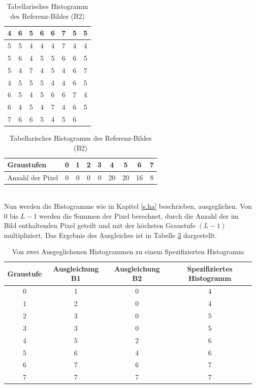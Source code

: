   \begin{table}
  [h]
  \caption{Tabellarisches Histogramm des Referenz-Bildes (B2)}
  \label{tab:b2}
  \centering
  \begin{minipage}{\textwidth}
  \center
  \begin{tabular}{|c|c|c|c|c|c|c|c|}
  \hline
  4&6&5&6&6&7&5&5\\
  \hline
  5&5&4&4&4&7&4&4\\
  \hline
  5&6&4&5&5&6&6&5\\
  \hline
  5&4&7&4&5&4&6&7\\
  \hline
  4&5&5&5&4&4&6&5\\
  \hline
  6&5&4&5&6&6&7&4\\
  \hline
  6&4&5&4&7&4&6&5\\
  \hline
  7&6&6&5&4&5&6&\\ %
  \hline
  \end{tabular}
  \end{minipage}
  \begin{minipage}{\textwidth}
  \hspace{\textwidth}
  \end{minipage}
  \begin{minipage}{\textwidth}
  \center
  \begin{tabular}{|l|c|c|c|c|c|c|c|c|}
  \hline
  Graustufen & 0 & 1 & 2 & 3 & 4 & 5 & 6 & 7\\
  \hline
  Anzahl der Pixel & 0 & 0 & 0 & 0 & 20 & 20 & 16 & 8\\
  \hline
  \end{tabular}
  \end{minipage}
  \end{table}\\
Nun werden die Histogramme wie in Kapitel \ref{s.ha} beschrieben, ausgeglichen. Von 0 bis $L-1$ werden die Summen der Pixel berechnet, durch die Anzahl der im Bild enthaltenden Pixel geteilt und mit der höchsten Graustufe $(L-1)$ multipliziert. Das Ergebnis des Ausgleiches ist in Tabelle \ref{tab:hs} dargestellt.
\begin{table}
  [h]
  \caption{Von zwei Ausgeglichenen Histogrammen zu einem Spezifizierten Histogramm}
  \label{tab:hs}
  \centering
  \begin{tabular}{|c|c|c|c|}
  \hline
  Graustufe & Ausgleichung B1 & Ausgleichung B2 & Spezifiziertes Histogramm\\
  \hline
  0 & 1 & 0 & 4\\
  \hline
  1 & 2 & 0 & 4\\
  \hline
  2 & 3 & 0 & 5\\
  \hline
  3 & 3 & 0 & 5\\
  \hline
  4 & 5 & 2 & 6\\
  \hline
  5 & 6 & 4 & 6\\
  \hline
  6 & 7 & 6 & 7\\
  \hline
  7 & 7 & 7 & 7\\
  \hline
  \end{tabular}
  \end{table}
